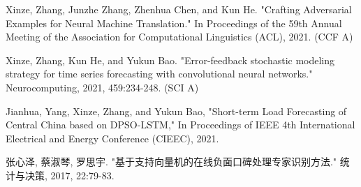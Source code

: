 
\begin{cventries}
    \vspace{-1.5mm}
    \cvpapers
    {
        \begin{cvitems}
            \item {Xinze, Zhang, Junzhe Zhang, Zhenhua Chen, and Kun He. "Crafting Adversarial Examples for Neural Machine Translation." In Proceedings of the 59th Annual Meeting of the Association for Computational Linguistics (ACL), 2021. (CCF A)}
            \item {Xinze, Zhang, Kun He, and Yukun Bao. "Error-feedback stochastic modeling strategy for time series forecasting with convolutional neural networks." Neurocomputing, 2021, 459:234-248. (SCI A)}
            \item {Jianhua, Yang, Xinze, Zhang, and Yukun Bao, "Short-term Load Forecasting of Central China based on DPSO-LSTM," In Proceedings of IEEE 4th International Electrical and Energy Conference (CIEEC), 2021.}
            \item {张心泽, 蔡淑琴, 罗思宇. "基于支持向量机的在线负面口碑处理专家识别方法." 统计与决策, 2017, 22:79-83.}
        \end{cvitems}
    }
\end{cventries}